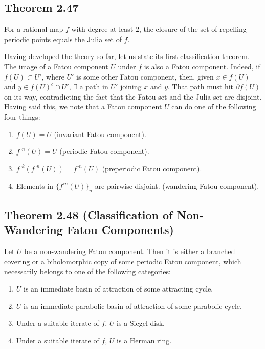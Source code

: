 \documentclass[11pt,a4paper]{article}
\begin{document}
        \subsection*{Theorem 2.47} For a rational map $f$ with degree at least $2$, the closure of the set of repelling periodic points equals the Julia set of $f$.



        Having developed the theory so far, let us state its first classification theorem. The image of a Fatou component $U$ under $f$ is also a Fatou component. Indeed, if $f(U) \subset U'$, where $U'$ is some other Fatou component, then, given $x \in f(U)$ and $y \in f(U)^c\cap U'$, $\exists$ a path in $U'$ joining $x$ and $y$. That path must hit $\partial f(U)$ on its way, contradicting the fact that the Fatou set and the Julia set are disjoint. Having said this, we note that a Fatou component $U$ can do one of the following four things:
        \begin{enumerate}
            \item $f(U) = U$ (invariant Fatou component).
            \item $f^{\circ n}(U) = U$ (periodic Fatou component).
            \item $f^{\circ k}(f^{\circ n}(U)) = f^{\circ n}(U)$ (preperiodic Fatou component).
            \item Elements in $\{f^{\circ n}(U)\}_n$ are pairwise disjoint. (wandering Fatou component).
        \end{enumerate}

        \subsection*{Theorem 2.48 (Classification of Non-Wandering Fatou Components)} Let $U$ be a non-wandering Fatou component. Then it is either a branched covering or a biholomorphic copy of some periodic Fatou component, which necessarily belongs to one of the following categories:
        \begin{enumerate}
            \item $U$ is an immediate basin of attraction of some attracting cycle.
            \item $U$ is an immediate parabolic basin of attraction of some parabolic cycle.
            \item Under a suitable iterate of $f$, $U$ is a Siegel disk.
            \item Under a suitable iterate of $f$, $U$ is a Herman ring.
        \end{enumerate}


\end{document}
